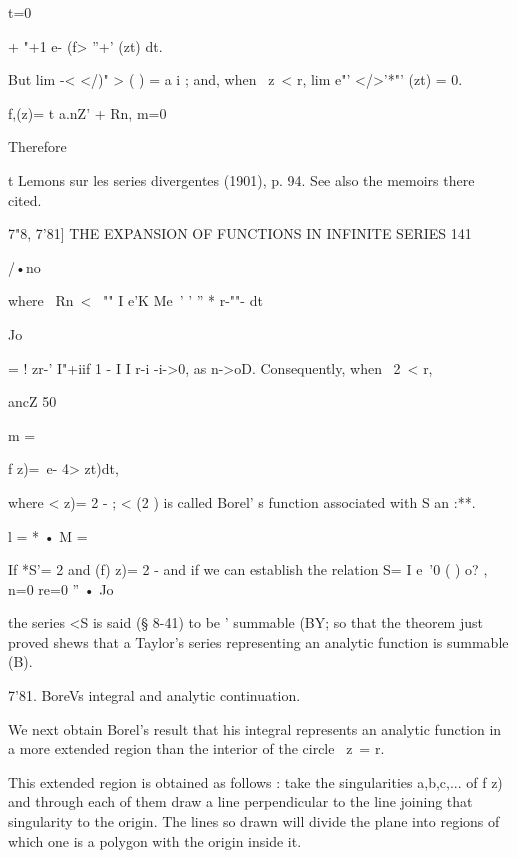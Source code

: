 { t=0 






+  "+1 e-  (f> ''+'  (zt) dt. 



But lim  -< </)" > ( ) = a i ; and, when \ z\ < r, lim e"' </>'*"' (zt) = 0. 



f,(z)= t a.nZ'  + Rn, 
m=0 



Therefore 

t Lemons sur les series divergentes (1901), p. 94. See also the memoirs there cited. 



7"8, 7'81] THE EXPANSION OF FUNCTIONS IN INFINITE SERIES 141 

/•no 

where \ Rn\ < \  ""  I e'K Me\ '  ' '' *  r-""-  dt 

Jo 

= ! zr-' I"+iif  1 - I   I r-i -i->0, as n->oD. 
Consequently, when \ 2\ <  r, 



ancZ 50 



m = 

f z)=\ e- 4> zt)dt, 



where <  z)= 2 -  ; < (2 ) is called Borel' s function associated with S an :**. 

 l =  * • M = 



If *S'= 2    and (f) z)= 2 -  and if we can establish the relation S= I e~'0 ( ) o? , 
n=0 re=0 ''  • Jo 

the series <S is said (§ 8-41) to be ' summable (BY; so that the theorem just proved 
shews that a Taylor's series representing an analytic function is summable (B). 

7'81. BoreVs integral and analytic continuation. 

We next obtain Borel's result that his integral represents an analytic function in 
a more extended region than the interior of the circle \ z\ = r. 




This extended region is obtained as follows : take the singularities a,b,c,... of f z) and 
through each of them draw a line perpendicular to the line joining that singularity to the 
origin. The lines so drawn will divide the plane into regions of which one is a polygon 
with the origin inside it. 

}
